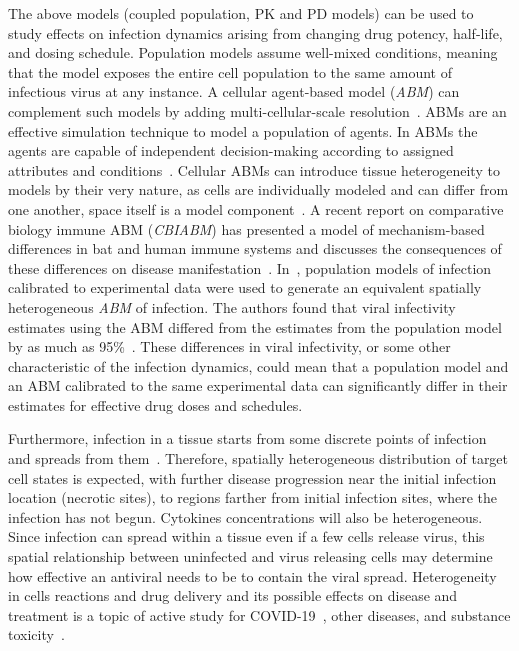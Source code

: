The above models (coupled population, PK and PD models) can be used to study effects on infection dynamics arising from changing drug potency, half-life, and dosing schedule. Population models assume well-mixed conditions, meaning that the model exposes the entire cell population to the same amount of infectious virus at any instance. A cellular agent-based model (\emph{ABM}) can complement such models by adding multi-cellular-scale resolution~\cite{zarnitsyna2021advancing}. ABMs are an effective simulation technique to model a population of agents. In ABMs the agents are capable of independent decision-making according to assigned attributes and conditions~\cite{glazier2007magnetization, bonabeau2002agent}. Cellular ABMs can introduce tissue heterogeneity to models by their very nature, as cells are individually modeled and can differ from one another, space itself is a model component~\cite{sego_modular_2020, sego2022multiscale, 10.1371/journal.pone.0007190, gast2016computational, getz_iterative_2021}. A recent report on comparative biology immune  ABM (\textit{CBIABM}) has presented a model of mechanism-based differences in bat and human immune systems and discusses the consequences of these differences on disease manifestation~\cite{cockrell2021comparative}. In~\cite{sego2022multiscale}, population models of infection calibrated to experimental data were used to generate an equivalent spatially heterogeneous \emph{ABM} of infection. The authors found that viral infectivity estimates using the ABM differed from the estimates from the population model by as much as 95\%~\cite{sego2022multiscale}. These differences in viral infectivity, or some other characteristic of the infection dynamics, could mean that a population model and an ABM calibrated to the same experimental data can significantly differ in their estimates for effective drug doses and schedules.

Furthermore, infection in a tissue starts from some discrete points of infection and spreads from them~\cite{zeng2020pulmonary, remmelink2020unspecific}. Therefore, spatially heterogeneous distribution of target cell states is expected, with further disease progression near the initial infection location (necrotic sites), to regions farther from initial infection sites, where the infection has not begun. Cytokines concentrations will also be heterogeneous. Since infection can spread within a tissue even if a few cells release virus, this spatial relationship between uninfected and virus releasing cells may determine how effective an antiviral needs to be to contain the viral spread. Heterogeneity in cells reactions and drug delivery and its possible effects on disease and treatment is a topic of active study for COVID-19~\cite{fiege2021single}, other diseases, and substance toxicity~\cite{ordonez2020dynamic, ben2019spatial, diaz2013multi, dheda2018drug}.

